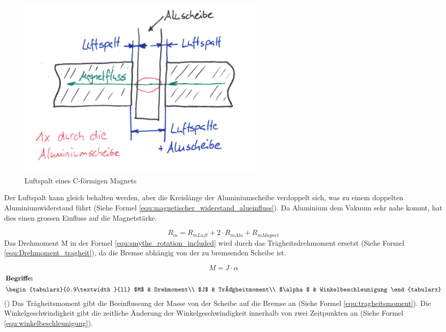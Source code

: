 \begin{figure}[ht]
\begin{center}
  \includegraphics[width=12cm]{assets/images/magnet_design/magnet_luftspalt_c_formig}
\end{center}
\vspace{-3ex}
\caption{Luftspalt eines C-förmigen Magnets}
\label{fig:magnet_design_c_magnet_luftspalt}
\end{figure}

Der Luftspalt kann gleich behalten werden, aber die Kreislänge der Aluminiumscheibe verdoppelt sich, was zu einem doppelten Aluminiumwiderstand führt (Siehe Formel \ref{equ:magnetischer_widerstand_alueinfluss}). Da Aluminium dem Vakuum sehr nahe kommt, hat dies einen grossen Einfluss auf die Magnetstärke.

\begin{equation}
  \label{equ:magnetischer_widerstand_alueinfluss}
  R_m=R_{m Luft}+2 \cdot R_{m Alu}+R_{m Magnet}
\end{equation}
\newpara
Das Drehmoment M in der Formel \ref{equ:smythe_rotation_included} wird durch das Trägheitsdrehmoment ersetzt (Siehe Formel \ref{equ:Drehmoment_tragheit}), da die Bremse abhängig von der zu bremsenden Scheibe ist.

\begin{equation}
  \label{equ:Drehmoment_tragheit}
  M=J\cdot\alpha
\end{equation}
\begin{gather}
\shortintertext{\textbf{Begriffe:}}
\begin{tabularx}{0.9\textwidth}{ll}
  $M$  & Drehmoment\\
  $J$  & Trägheitmoment\\
  $\alpha$ & Winkelbeschleunigung
\end{tabularx}\nonumber
\end{gather}
(\cite[S.127]{kuchling2014taschenbuch})
\newpara
Das Trägheitsmoment gibt die Beeinflussung der Masse von der Scheibe auf die Bremse an (Siehe Formel \ref{equ:tragheitsmoment}). Die Winkelgeschwindigkeit gibt die zeitliche Änderung der Winkelgeschwindigkeit innerhalb von zwei Zeitpunkten an (Siehe Formel \ref{equ:winkelbeschleunigung}).

